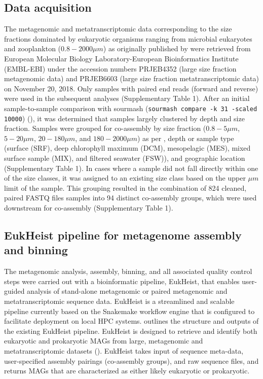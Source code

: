 \documentclass[12pt]{article}
\numberwithin{equation}{section}
\begin{document}
\subsection*{Data acquisition} The metagenomic and metatranscriptomic data corresponding to the size fractions dominated by eukaryotic organisms ranging from ﻿microbial eukaryotes and zooplankton ($0.8 -  2000 \mu m$) as originally published by \citet{Carradec2018global} were retrieved from ﻿European Molecular Biology Laboratory-European Bioinformatics Institute (EMBL-EBI) under the accession numbers PRJEB4352 (large size fraction metagenomic data) and PRJEB6603 (large size fraction metatranscriptomic data) on November 20, 2018. Only samples with paired end reads (forward and reverse) were used in the subsequent analyses (Supplementary Table 1). After an initial sample-to-sample comparison with sourmash (\texttt{sourmash compare -k 31 -scaled 10000}) \citep{Titus_Brown_2016} (), it was determined that samples largely clustered by depth and size fraction. Samples were grouped for co-assembly by size fraction ($0.8 - 5 \mu m$, $5-20 \mu m$, $20-180 \mu m$, and $180-2000 \mu m$) as per \citet{Carradec2018global}, depth or sample type (surface (SRF), deep chlorophyll maximum (DCM), mesopelagic (MES), mixed surface sample (MIX), and filtered seawater (FSW)), and geographic location (Supplementary Table 1). In cases where a sample did not fall directly within one of the size classes, it was assigned to an existing size class based on the upper $\mu m$ limit of the sample. This grouping resulted in the combination of 824 cleaned, paired FASTQ files samples into 94 distinct co-assembly groups, which were used downstream for co-assembly (Supplementary Table 1). 

\subsection*{EukHeist pipeline for metagenome assembly and binning}The metagenomic analysis, assembly, binning, and all associated quality control steps were carried out with a bioinformatic pipeline, EukHeist, that enables user-guided analysis of stand-alone metagenomic or paired metagenomic and metatranscriptomic sequence data. EukHeist is a streamlined and scalable pipeline currently based on the Snakemake workflow engine \citep{Koster2012} that is configured to facilitate deployment on local HPC systems.  outlines the structure and outputs of the existing EukHeist pipeline. EukHeist is designed to retrieve and identify both eukaryotic and prokaryotic MAGs from large, metagenomic and metatranscriptomic datasets (). EukHeist takes input of sequence meta-data, user-specified assembly pairings (co-assembly groups), and raw sequence files, and returns MAGs that are characterized as either likely eukaryotic or prokaryotic. 
\end{document}
